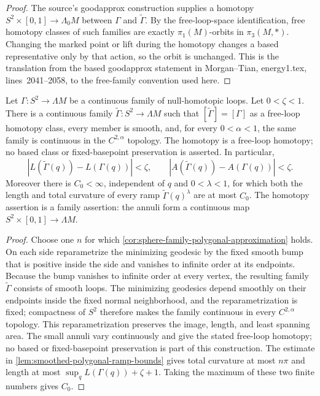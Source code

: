 \begin{proof}
The source's goodapprox construction supplies a homotopy
$S^2\times[0,1]\to\Lambda_0M$ between $\Gamma$ and
$\widetilde\Gamma$.  By the free-loop-space identification, free homotopy
classes of such families are exactly $\pi_1(M)$-orbits in $\pi_3(M,*)$.
Changing the marked point or lift during the homotopy changes a based
representative only by that action, so the orbit is unchanged.  This is the
translation from the based goodapprox statement in Morgan--Tian,
energy1.tex, lines~2041--2058, to the free-family convention used here.
\end{proof}

\begin{theorem}
\label{thm:uniform-controlled-ramp-approximation}
\notready
Let $\Gamma\colon S^2\to\Lambda M$ be a continuous family of
null-homotopic loops.  Let $0<\zeta<1$.  There is a continuous family
$\widetilde\Gamma\colon S^2\to\Lambda M$ such that
$[\widetilde\Gamma]=[\Gamma]$ as a free-loop homotopy class, every member is
smooth, and, for every
$0<\alpha<1$, the same family is continuous in the $C^{2,\alpha}$ topology.
The homotopy is a free-loop homotopy; no based class or fixed-basepoint
preservation is asserted.  In particular,
\[
 |L(\widetilde\Gamma(q))-L(\Gamma(q))|<\zeta,\qquad
 |A(\widetilde\Gamma(q))-A(\Gamma(q))|<\zeta.
\]
Moreover there is $C_0<\infty$, independent of $q$ and
$0<\lambda<1$, for which both the length and total curvature of every ramp
$\widetilde\Gamma(q)^\lambda$ are at most $C_0$.
The homotopy assertion is a family assertion: the annuli form a continuous
map $S^2\times[0,1]\to\Lambda M$.
\end{theorem}
\begin{proof}
Choose one $n$ for which
\ref{cor:sphere-family-polygonal-approximation} holds.  On each
side reparametrize the minimizing geodesic by the fixed smooth bump that is
positive inside the side and vanishes to infinite order at its endpoints.
Because the bump vanishes to infinite order at every vertex, the resulting
family $\widetilde\Gamma$ consists of smooth loops.  The minimizing geodesics
depend smoothly on their endpoints inside the fixed normal neighborhood, and
the reparametrization is fixed; compactness of $S^2$ therefore makes the
family continuous in every $C^{2,\alpha}$ topology.  This reparametrization
preserves the image, length, and least spanning area.
The small annuli vary continuously and give the stated free-loop homotopy;
no based or fixed-basepoint preservation is part of this construction.
The estimate in
\ref{lem:smoothed-polygonal-ramp-bounds} gives total curvature at most
$n\pi$ and length at most
$\sup_qL(\Gamma(q))+\zeta+1$.  Taking the maximum of these two finite
numbers gives $C_0$.
\end{proof}

